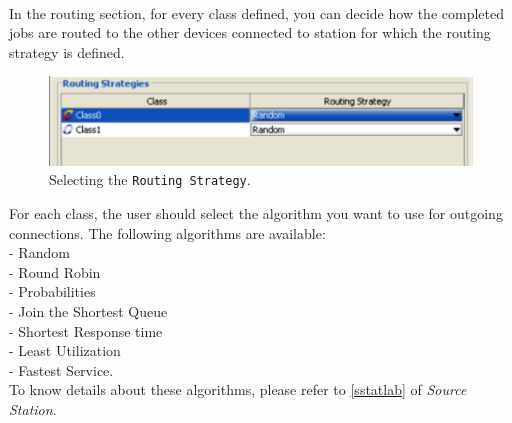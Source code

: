 \\ In the routing section, for
every class defined, you can decide how the completed jobs are
routed to the other devices connected to station for which the
routing strategy is defined.
\begin{figure}[htb]
    \begin{center}
        \includegraphics[scale=.5]{img/jsimg/8.19.eps}
    \end{center}
    \caption{Selecting the \texttt{Routing Strategy}.}
    \label{fig:selroutstrate}
\end{figure}
For each class, the user should select the algorithm you want to
use for outgoing connections. The following algorithms are available:\\
- Random\\ - Round Robin\\ - Probabilities\\ - Join the Shortest Queue\\
- Shortest Response time\\ - Least Utilization\\ - Fastest Service.\\
To know details about these algorithms, please refer to
\autoref{sstatlab} of \emph{Source Station}.

